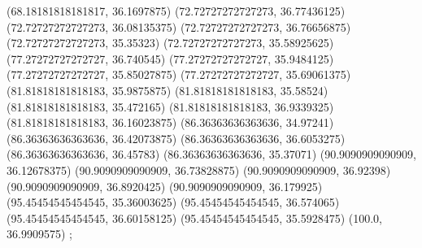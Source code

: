 {{{		(68.18181818181817, 36.1697875)
		(72.72727272727273, 36.77436125)
		(72.72727272727273, 36.08135375)
		(72.72727272727273, 36.76656875)
		(72.72727272727273, 35.35323)
		(72.72727272727273, 35.58925625)
		(77.27272727272727, 36.740545)
		(77.27272727272727, 35.9484125)
		(77.27272727272727, 35.85027875)
		(77.27272727272727, 35.69061375)
		(81.81818181818183, 35.9875875)
		(81.81818181818183, 35.58524)
		(81.81818181818183, 35.472165)
		(81.81818181818183, 36.9339325)
		(81.81818181818183, 36.16023875)
		(86.36363636363636, 34.97241)
		(86.36363636363636, 36.42073875)
		(86.36363636363636, 36.6053275)
		(86.36363636363636, 36.45783)
		(86.36363636363636, 35.37071)
		(90.9090909090909, 36.12678375)
		(90.9090909090909, 36.73828875)
		(90.9090909090909, 36.92398)
		(90.9090909090909, 36.8920425)
		(90.9090909090909, 36.179925)
		(95.45454545454545, 35.36003625)
		(95.45454545454545, 36.574065)
		(95.45454545454545, 36.60158125)
		(95.45454545454545, 35.5928475)
		(100.0, 36.9909575)
	};

}}

